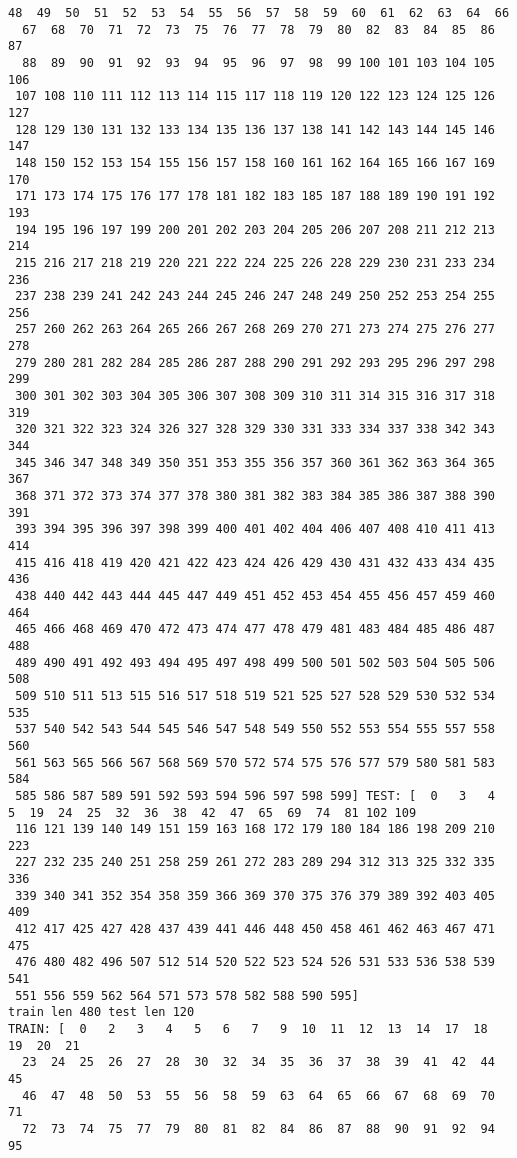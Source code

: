 \documentclass[11pt]{article}
\begin{document}
\begin{Verbatim}[commandchars=\\\{\}]
  48  49  50  51  52  53  54  55  56  57  58  59  60  61  62  63  64  66
  67  68  70  71  72  73  75  76  77  78  79  80  82  83  84  85  86  87
  88  89  90  91  92  93  94  95  96  97  98  99 100 101 103 104 105 106
 107 108 110 111 112 113 114 115 117 118 119 120 122 123 124 125 126 127
 128 129 130 131 132 133 134 135 136 137 138 141 142 143 144 145 146 147
 148 150 152 153 154 155 156 157 158 160 161 162 164 165 166 167 169 170
 171 173 174 175 176 177 178 181 182 183 185 187 188 189 190 191 192 193
 194 195 196 197 199 200 201 202 203 204 205 206 207 208 211 212 213 214
 215 216 217 218 219 220 221 222 224 225 226 228 229 230 231 233 234 236
 237 238 239 241 242 243 244 245 246 247 248 249 250 252 253 254 255 256
 257 260 262 263 264 265 266 267 268 269 270 271 273 274 275 276 277 278
 279 280 281 282 284 285 286 287 288 290 291 292 293 295 296 297 298 299
 300 301 302 303 304 305 306 307 308 309 310 311 314 315 316 317 318 319
 320 321 322 323 324 326 327 328 329 330 331 333 334 337 338 342 343 344
 345 346 347 348 349 350 351 353 355 356 357 360 361 362 363 364 365 367
 368 371 372 373 374 377 378 380 381 382 383 384 385 386 387 388 390 391
 393 394 395 396 397 398 399 400 401 402 404 406 407 408 410 411 413 414
 415 416 418 419 420 421 422 423 424 426 429 430 431 432 433 434 435 436
 438 440 442 443 444 445 447 449 451 452 453 454 455 456 457 459 460 464
 465 466 468 469 470 472 473 474 477 478 479 481 483 484 485 486 487 488
 489 490 491 492 493 494 495 497 498 499 500 501 502 503 504 505 506 508
 509 510 511 513 515 516 517 518 519 521 525 527 528 529 530 532 534 535
 537 540 542 543 544 545 546 547 548 549 550 552 553 554 555 557 558 560
 561 563 565 566 567 568 569 570 572 574 575 576 577 579 580 581 583 584
 585 586 587 589 591 592 593 594 596 597 598 599] TEST: [  0   3   4   5  19  24  25  32  36  38  42  47  65  69  74  81 102 109
 116 121 139 140 149 151 159 163 168 172 179 180 184 186 198 209 210 223
 227 232 235 240 251 258 259 261 272 283 289 294 312 313 325 332 335 336
 339 340 341 352 354 358 359 366 369 370 375 376 379 389 392 403 405 409
 412 417 425 427 428 437 439 441 446 448 450 458 461 462 463 467 471 475
 476 480 482 496 507 512 514 520 522 523 524 526 531 533 536 538 539 541
 551 556 559 562 564 571 573 578 582 588 590 595]
train len 480 test len 120
TRAIN: [  0   2   3   4   5   6   7   9  10  11  12  13  14  17  18  19  20  21
  23  24  25  26  27  28  30  32  34  35  36  37  38  39  41  42  44  45
  46  47  48  50  53  55  56  58  59  63  64  65  66  67  68  69  70  71
  72  73  74  75  77  79  80  81  82  84  86  87  88  90  91  92  94  95

\end{Verbatim}
\end{document}
